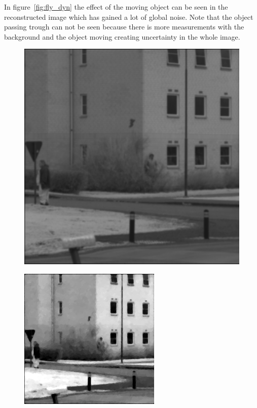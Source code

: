 In figure~\ref{fig:fly_dyn} the effect of the moving object can be seen in the reconstructed image which has gained a lot of global noise. Note that the object passing trough can not be seen because there is more measurements with the background and the object moving creating uncertainty in the whole image.   

\begin{figure}[H]
    \centering
\begin{minipage}[t]{0.32\textwidth}
    \includegraphics[width=1\textwidth]{result/dynamic/fly/flyby_1sec_org.png}
    \subcaption{}
    \label{fig:fly_1}
\end{minipage}
\begin{minipage}[t]{0.32\textwidth}
    \includegraphics[width = \textwidth]{result/dynamic/fly/flyby_1sec_ref.png}

\end{minipage}
\end{figure}
